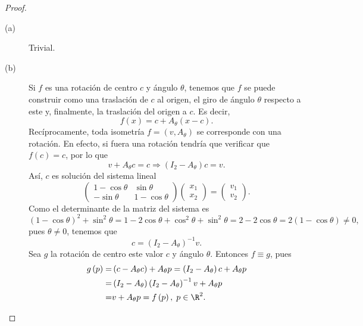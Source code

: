 \begin{proof}
\begin{description}
\item[(a)] Trivial.
\item[(b)] Si $\displaystyle f $ es una rotación de centro $\displaystyle c $  y ángulo $\displaystyle \theta $, tenemos que $\displaystyle f $ se puede construir como una traslación de $\displaystyle c $ al origen, el giro de ángulo $\displaystyle \theta $ respecto a este y, finalmente, la traslación del origen a $\displaystyle c $. Es decir,
	\[f\left(x\right) = c + A_{\theta}\left(x-c\right) .\]
Recíprocamente, toda isometría $\displaystyle f = \left(v, A_{\theta}\right) $ se corresponde con una rotación. En efecto, si fuera una rotación tendría que verificar que $\displaystyle f\left(c\right) = c $, por lo que 
\[v + A_{\theta}c = c \Rightarrow \left(I_{2}-A_{\theta}\right)c=v .\]
Así, $\displaystyle c $ es solución del sistema lineal
\[\begin{pmatrix} 1-\cos\theta & \sin\theta \\ -\sin\theta & 1 - \cos\theta \end{pmatrix}\begin{pmatrix} x_{1} \\ x_{2} \end{pmatrix} = \begin{pmatrix} v_{1} \\ v_{2} \end{pmatrix} .\]
Como el determinante de la matriz del sistema es
\[\left(1-\cos\theta\right)^{2}+ \sin ^{2}\theta = 1 - 2 \cos\theta + \cos^{2}\theta + \sin ^{2}\theta = 2 - 2\cos\theta = 2\left(1-\cos\theta\right) \neq 0,\]
pues $\displaystyle \theta \neq 0 $, tenemos que
\[c = \left(I_{2}-A_{\theta}\right)^{-1}v .\]
Sea $\displaystyle g $ la rotación de centro este valor $\displaystyle c $ y ángulo $\displaystyle \theta $. Entonces $\displaystyle f \equiv g $, pues
\[
\begin{split}
	g\left(p\right) = & \left(c-A_{\theta}c\right) + A_{\theta}p = \left(I_{2}-A_{\theta}\right)c + A_{\theta}p\\
	= & \left(I_{2}-A_{\theta}\right)\left(I_{2}-A_{\theta}\right)^{-1}v + A_{\theta}p \\
	= & v + A_{\theta}p = f\left(p\right), \; p \in \R^{2}.
\end{split}
\]
\end{description}
\end{proof}


